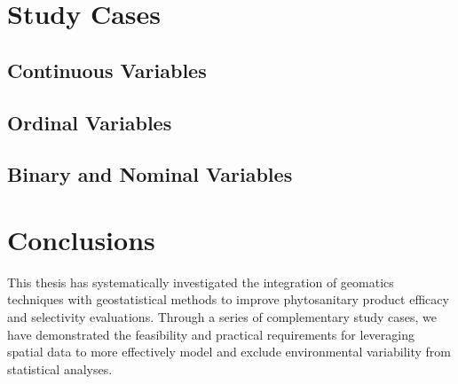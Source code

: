 \documentclass[12pt,a4paper,oneside]{report}
\begin{document}
\chapter{Study Cases}
\section{Continuous Variables}















\section{Ordinal Variables}




\section{Binary and Nominal Variables}


\chapter{Conclusions}

This thesis has systematically investigated the integration of geomatics techniques 
with geostatistical methods to improve phytosanitary product efficacy and selectivity evaluations. 
Through a series of complementary study cases, we have demonstrated the feasibility 
and practical requirements for leveraging spatial data to more effectively model 
and exclude environmental variability from statistical analyses.
\end{document}
